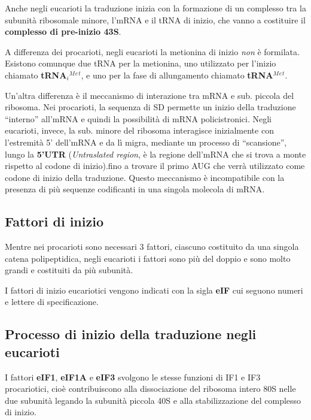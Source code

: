 \documentclass[11pt]{book}
\begin{document}
Anche negli eucarioti la traduzione inizia con la formazione di un
complesso tra la subunità ribosomale minore, l'mRNA e il tRNA di inizio,
che vanno a costituire il \textbf{complesso di pre-inizio 43S}.

A differenza dei procarioti, negli eucarioti la metionina di inizio
\emph{non} è formilata. Esistono comunque due tRNA per la metionina, uno
utilizzato per l'inizio chiamato \textbf{tRNA\(_i\)\(^M\)\(^e\)\(^t\)},
e uno per la fase di allungamento chiamato
\textbf{tRNA\(^M\)\(^e\)\(^t\)}.

Un'altra differenza è il meccanismo di interazione tra mRNA e sub.
piccola del ribosoma. Nei procarioti, la sequenza di SD permette un
inizio della traduzione ``interno'' all'mRNA e quindi la possibilità di
mRNA policistronici. Negli eucarioti, invece, la sub. minore del
ribosoma interagisce inizialmente con l'estremità 5' dell'mRNA e da lì
migra, mediante un processo di ``scansione'', lungo la \textbf{5'UTR}
(\emph{Untraslated region}, è la regione dell'mRNA che si trova a monte
rispetto al codone di inizio).fino a trovare il primo AUG che verrà
utilizzato come codone di inizio della traduzione. Questo meccanismo è
incompatibile con la presenza di più sequenze codificanti in una singola
molecola di mRNA.

\subsection{Fattori di inizio}\label{fattori-di-inizio}

Mentre nei procarioti sono necessari 3 fattori, ciascuno costituito da
una singola catena polipeptidica, negli eucarioti i fattori sono più del
doppio e sono molto grandi e costituiti da più subunità.

I fattori di inizio eucariotici vengono indicati con la sigla
\textbf{eIF} cui seguono numeri e lettere di specificazione.

\subsection{Processo di inizio della traduzione negli
eucarioti}\label{processo-di-inizio-della-traduzione-negli-eucarioti}

I fattori \textbf{eIF1}, \textbf{eIF1A} e \textbf{eIF3} svolgono le
stesse funzioni di IF1 e IF3 procariotici, cioè contribuiscono alla
dissociazione del ribosoma intero 80S nelle due subunità legando la
subunità piccola 40S e alla stabilizzazione del complesso di inizio.
\end{document}
